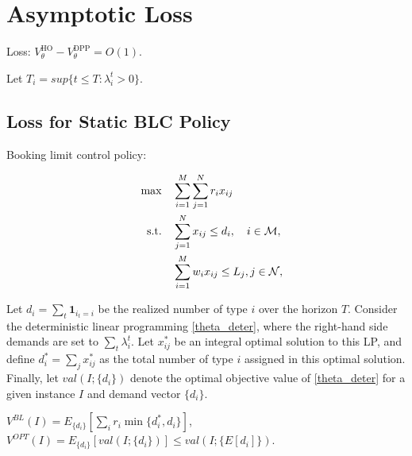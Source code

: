 \section{Asymptotic Loss}



\begin{lem}
    Loss: $V_{\theta}^{\text{HO}} - V_{\theta}^{\text{DPP}} = O(1)$. 
\end{lem}

Let $T_{i} = sup \{t \leq T: \lambda_{i}^{t} > 0\}$. 


\newpage

\subsection{Loss for Static BLC Policy}
Booking limit control policy:

\begin{align}
    \quad \max \quad & \sum_{i=1}^{M}  \sum_{j= 1}^{N} r_{i} x_{ij} \label{theta_deter} \\
    \text {s.t.} \quad & \sum_{j= 1}^{N} x_{ij} \leq d_{i}, \quad i \in \mathcal{M}, \notag \\ 
    & \sum_{i=1}^{M} w_{i} x_{ij} \leq L_j, j \in \mathcal{N}, \notag 
\end{align}


Let $d_{i} =\sum_{t} \bm{1}_{i_{t} = i}$ be the realized number of type $i$ over the horizon $T$. 
Consider the deterministic linear programming \eqref{theta_deter}, where the right-hand side demands are set to $\sum_{t} \lambda_{i}^{t}$. Let $x_{ij}^{*}$ be an integral optimal solution to this LP, and define $d_{i}^{*} = \sum_{j} x_{ij}^{*}$ as the total number of type $i$ assigned in this optimal solution. Finally, let $val(I; \{d_{i}\})$ denote the optimal objective value of \eqref{theta_deter} for a given instance $I$ and demand vector $\{d_{i}\}$.

$V^{BL}(I) = E_{\{d_{i}\}}[\sum_{i} r_{i} \min\{d_{i}^{*}, d_{i}\}]$, $V^{OPT}(I) = E_{\{d_{i}\}} [val(I; \{d_{i}\})] \leq val(I; \{E[d_{i}]\})$.

